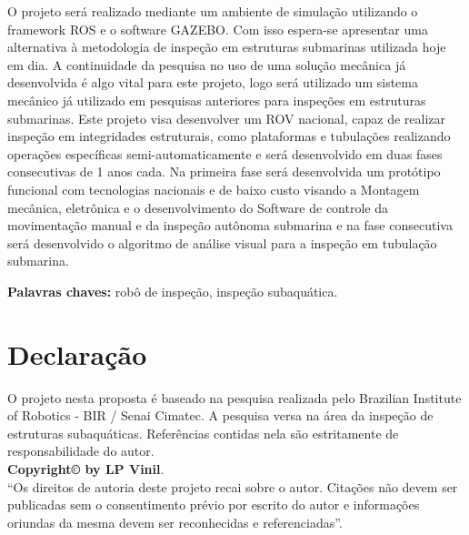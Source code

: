 O projeto será realizado mediante um ambiente de simulação utilizando o framework ROS e o software GAZEBO. Com isso espera-se apresentar uma alternativa à metodologia de inspeção em estruturas submarinas utilizada hoje em dia. A continuidade da pesquisa no uso de uma solução mecânica já desenvolvida é algo vital para este projeto, logo será utilizado um sistema mecânico já utilizado em pesquisas anteriores para inspeções em estruturas submarinas.
Este projeto visa desenvolver um ROV nacional, capaz de realizar inspeção em integridades estruturais, como plataformas e tubulações realizando operações específicas semi-automaticamente e será desenvolvido em duas fases consecutivas de 1 anos cada. Na primeira fase será desenvolvida um protótipo funcional com tecnologias nacionais e de baixo custo visando a Montagem mecânica, eletrônica e o desenvolvimento do Software de controle da movimentação manual e da inspeção autônoma submarina e na fase consecutiva será desenvolvido o algoritmo de análise visual para a inspeção em tubulação submarina.

 

\vspace*{1cm}
\noindent \textbf{Palavras chaves: }robô de inspeção, inspeção subaquática.


\chapter*{Declaração}
O projeto nesta proposta é baseado na pesquisa realizada pelo Brazilian Institute of Robotics - BIR / Senai Cimatec. A pesquisa versa na área da inspeção de estruturas subaquáticas. Referências contidas nela são estritamente de responsabilidade do autor.\\
\vspace*{8cm}
\vfill
\noindent \textbf{Copyright\copyright{} by LP Vinil}.\\
``Os direitos de autoria deste projeto recai sobre o autor. Citações não devem ser publicadas sem o consentimento prévio por escrito do autor e informações oriundas da mesma devem ser reconhecidas e referenciadas''.




